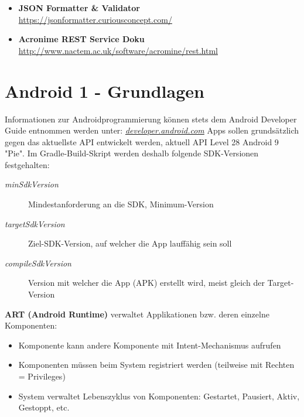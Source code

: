 \documentclass[a4paper]{article}
\begin{document}
\begin{itemize}
		\item \textbf{JSON Formatter \& Validator}\\
		\href{https://jsonformatter.curiousconcept.com/}
		{https://jsonformatter.curiousconcept.com/}
		
		\item \textbf{Acronime REST Service Doku}\\
		\href{http://www.nactem.ac.uk/software/acromine/rest.html}
		{http://www.nactem.ac.uk/software/acromine/rest.html}
		
	\end{itemize}
	
	\newpage
	
	\section{Android 1 - Grundlagen}
	Informationen zur Androidprogrammierung können stets dem Android Developer Guide entnommen werden unter: \textit{\href{https://developer.android.com/}{developer.android.com}}
	Apps sollen grundsätzlich gegen das aktuellste API entwickelt werden, aktuell API Level 28 Android 9 "Pie".
	Im Gradle-Build-Skript werden deshalb folgende SDK-Versionen festgehalten:
\vspace{1em}
	\begin{description}
		\item[\textit{minSdkVersion}] Mindestanforderung an die SDK, Minimum-Version
		\item[\textit{targetSdkVersion}] Ziel-SDK-Version, auf welcher die App lauffähig sein soll
		\item[\textit{compileSdkVersion}] Version mit welcher die App (APK) erstellt wird, meist gleich der Target-Version	
	\end{description}
\vspace{1em}
	\textbf{ART (Android Runtime)} verwaltet Applikationen bzw. deren einzelne Komponenten:
	\begin{itemize}
		\item Komponente kann andere Komponente mit Intent-Mechanismus aufrufen
		\item Komponenten müssen beim System registriert werden (teilweise mit Rechten = Privileges)
		\item System verwaltet Lebenszyklus von Komponenten: Gestartet, Pausiert, Aktiv, Gestoppt, etc.
	\end{itemize}
\end{document}
